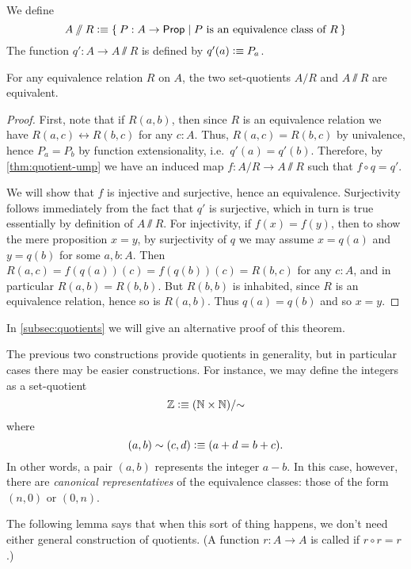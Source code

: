 \begin{defn}\label{def:VVquotient}
  We define
  \begin{equation*}
    A\sslash R \defeq \setof{ P:A\to\prop | P \text{ is an equivalence class of } R}
  \end{equation*}
  The function $q':A\to A\sslash R$ is defined by $q'(a) \vcentcolon\equiv P_a$.
\end{defn}

\begin{thm}
  For any equivalence relation $R$ on $A$, the two set-quotients $A/R$ and $A\sslash R$ are equivalent.
\end{thm}
\begin{proof}
  First, note that if $R(a,b)$, then since $R$ is an equivalence relation we have $R(a,c) \leftrightarrow R(b,c)$ for any $c:A$.
  Thus, $R(a,c) = R(b,c)$ by univalence, hence $P_a=P_b$ by function extensionality, i.e.\ $q'(a)=q'(b)$.
  Therefore, by \autoref{thm:quotient-ump} we have an induced map $f:A/R \to A\sslash R$ such that $f\circ q = q'$.

  We will show that $f$ is injective and surjective, hence an equivalence.
  Surjectivity follows immediately from the fact that $q'$ is surjective, which in turn is true essentially by definition of $A\sslash R$.
  For injectivity, if $f(x)=f(y)$, then to show the mere proposition $x=y$, by surjectivity of $q$ we may assume $x=q(a)$ and $y=q(b)$ for some $a,b:A$.
  Then $R(a,c) = f(q(a))(c) = f(q(b))(c) = R(b,c)$ for any $c:A$, and in particular $R(a,b) = R(b,b)$.
  But $R(b,b)$ is inhabited, since $R$ is an equivalence relation, hence so is $R(a,b)$.
  Thus $q(a)=q(b)$ and so $x=y$.
\end{proof}

In \autoref{subsec:quotients} we will give an alternative proof of this theorem.

\begin{rmk}\label{defn-Z}
The previous two constructions provide quotients in generality, but in particular cases there may be easier constructions.
For instance, we may define the integers \Z as a set-quotient
%
\[ \mathbb{Z} \vcentcolon\equiv (\mathbb{N} \times \mathbb{N})/{\sim} \]
%
where
%
\[ (a,b) \sim (c,d) \vcentcolon\equiv (a + d = b + c). \]
%
In other words, a pair $(a,b)$ represents the integer $a - b$.
In this case, however, there are \emph{canonical representatives} of the equivalence classes: those of the form $(n,0)$ or $(0,n)$.
\end{rmk}

The following lemma says that when this sort of thing happens, we don't need either general construction of quotients.
(A function $r:A\to A$ is called  if $r\circ r = r$.)

